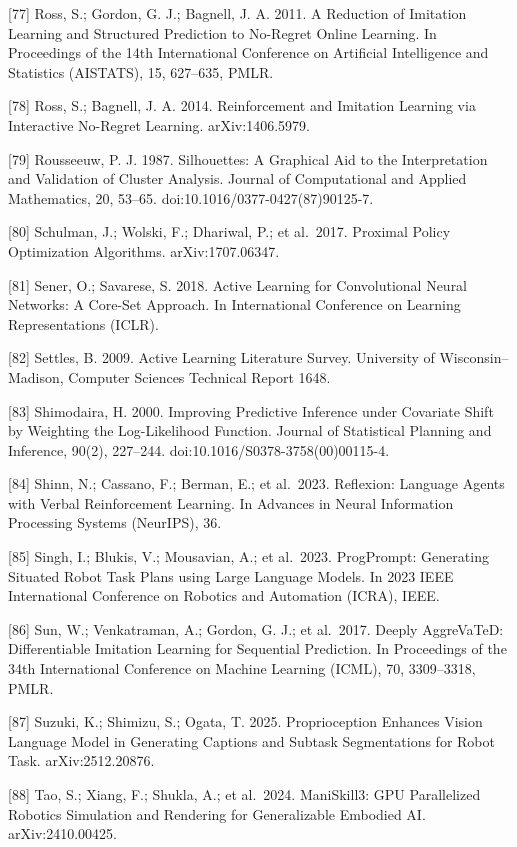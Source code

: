 \documentclass[
  11pt,
]{article}
\begin{document}
{[}77{]} Ross, S.; Gordon, G. J.; Bagnell, J. A. 2011. A Reduction of
Imitation Learning and Structured Prediction to No-Regret Online
Learning. In Proceedings of the 14th International Conference on
Artificial Intelligence and Statistics (AISTATS), 15, 627--635, PMLR.

{[}78{]} Ross, S.; Bagnell, J. A. 2014. Reinforcement and Imitation
Learning via Interactive No-Regret Learning. arXiv:1406.5979.

{[}79{]} Rousseeuw, P. J. 1987. Silhouettes: A Graphical Aid to the
Interpretation and Validation of Cluster Analysis. Journal of
Computational and Applied Mathematics, 20, 53--65.
doi:10.1016/0377-0427(87)90125-7.

{[}80{]} Schulman, J.; Wolski, F.; Dhariwal, P.; et al.~2017. Proximal
Policy Optimization Algorithms. arXiv:1707.06347.

{[}81{]} Sener, O.; Savarese, S. 2018. Active Learning for Convolutional
Neural Networks: A Core-Set Approach. In International Conference on
Learning Representations (ICLR).

{[}82{]} Settles, B. 2009. Active Learning Literature Survey. University
of Wisconsin--Madison, Computer Sciences Technical Report 1648.

{[}83{]} Shimodaira, H. 2000. Improving Predictive Inference under
Covariate Shift by Weighting the Log-Likelihood Function. Journal of
Statistical Planning and Inference, 90(2), 227--244.
doi:10.1016/S0378-3758(00)00115-4.

{[}84{]} Shinn, N.; Cassano, F.; Berman, E.; et al.~2023. Reflexion:
Language Agents with Verbal Reinforcement Learning. In Advances in
Neural Information Processing Systems (NeurIPS), 36.

{[}85{]} Singh, I.; Blukis, V.; Mousavian, A.; et al.~2023. ProgPrompt:
Generating Situated Robot Task Plans using Large Language Models. In
2023 IEEE International Conference on Robotics and Automation (ICRA),
IEEE.

{[}86{]} Sun, W.; Venkatraman, A.; Gordon, G. J.; et al.~2017. Deeply
AggreVaTeD: Differentiable Imitation Learning for Sequential Prediction.
In Proceedings of the 34th International Conference on Machine Learning
(ICML), 70, 3309--3318, PMLR.

{[}87{]} Suzuki, K.; Shimizu, S.; Ogata, T. 2025. Proprioception
Enhances Vision Language Model in Generating Captions and Subtask
Segmentations for Robot Task. arXiv:2512.20876.

{[}88{]} Tao, S.; Xiang, F.; Shukla, A.; et al.~2024. ManiSkill3: GPU
Parallelized Robotics Simulation and Rendering for Generalizable
Embodied AI. arXiv:2410.00425.
\end{document}
